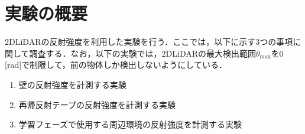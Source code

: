
\section{実験の概要}

  2DLiDARの反射強度を利用した実験を行う．ここでは，以下に示す3つの事項に関して調査する．なお，以下の実験では，2DLiDARの最大検出範囲$\theta_{\text{max}}$を0 \,[rad]で制限して，前の物体しか検出しないようにしている．

\vspace{1cm}

  \begin{enumerate}
    \item 壁の反射強度を計測する実験
    \item 再帰反射テープの反射強度を計測する実験
    \item 学習フェーズで使用する周辺環境の反射強度を計測する実験
  \end{enumerate}

\newpage